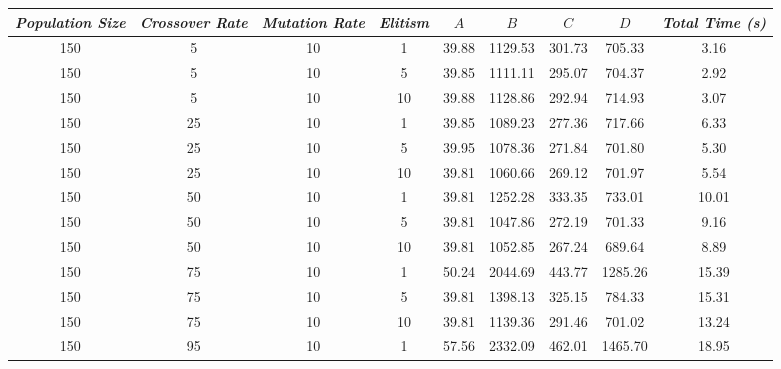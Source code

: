 \begin{table}[h]
\centering
\footnotesize
{\renewcommand{\arraystretch}{1}}
\begin{tabular}{cccc|c|c|c|c|c}
\textit{Population Size} & \textit{Crossover Rate} & \textit{Mutation Rate} & \textit{Elitism} & $A$ & $B$ & $C$ & $D$ & \textit{Total Time (s)} \\\hline
150 & 5 & 10 & 1 & \cellcolor{gray!50}39.88 & \cellcolor{gray!13}1129.53 & \cellcolor{gray!1}301.73 & \cellcolor{gray!42}705.33 & 3.16\\
150 & 5 & 10 & 5 & \cellcolor{gray!50}39.85 & \cellcolor{gray!16}1111.11 & \cellcolor{gray!1}295.07 & \cellcolor{gray!42}704.37 & 2.92\\
150 & 5 & 10 & 10 & \cellcolor{gray!50}39.88 & \cellcolor{gray!13}1128.86 & \cellcolor{gray!1}292.94 & \cellcolor{gray!39}714.93 & 3.07\\
150 & 25 & 10 & 1 & \cellcolor{gray!50}39.85 & \cellcolor{gray!21}1089.23 & \cellcolor{gray!4}277.36 & \cellcolor{gray!38}717.66 & 6.33\\
150 & 25 & 10 & 5 & \cellcolor{gray!49}39.95 & \cellcolor{gray!23}1078.36 & \cellcolor{gray!10}271.84 & \cellcolor{gray!43}701.80 & 5.30\\
150 & 25 & 10 & 10 & \cellcolor{gray!50}39.81 & \cellcolor{gray!26}1060.66 & \cellcolor{gray!13}269.12 & \cellcolor{gray!43}701.97 & 5.54\\
150 & 50 & 10 & 1 & \cellcolor{gray!50}39.81 & \cellcolor{gray!1}1252.28 & \cellcolor{gray!1}333.35 & \cellcolor{gray!33}733.01 & 10.01\\
150 & 50 & 10 & 5 & \cellcolor{gray!50}39.81 & \cellcolor{gray!28}1047.86 & \cellcolor{gray!10}272.19 & \cellcolor{gray!43}701.33 & 9.16\\
150 & 50 & 10 & 10 & \cellcolor{gray!50}39.81 & \cellcolor{gray!27}1052.85 & \cellcolor{gray!15}267.24 & \cellcolor{gray!47}689.64 & 8.89\\
150 & 75 & 10 & 1 & \cellcolor{gray!1}50.24 & \cellcolor{gray!1}2044.69 & \cellcolor{gray!1}443.77 & \cellcolor{gray!1}1285.26 & 15.39\\
150 & 75 & 10 & 5 & \cellcolor{gray!50}39.81 & \cellcolor{gray!1}1398.13 & \cellcolor{gray!1}325.15 & \cellcolor{gray!17}784.33 & 15.31\\
150 & 75 & 10 & 10 & \cellcolor{gray!50}39.81 & \cellcolor{gray!11}1139.36 & \cellcolor{gray!1}291.46 & \cellcolor{gray!43}701.02 & 13.24\\
150 & 95 & 10 & 1 & \cellcolor{gray!1}57.56 & \cellcolor{gray!1}2332.09 & \cellcolor{gray!1}462.01 & \cellcolor{gray!1}1465.70 & 18.95\\

\end{tabular}
\end{table}
